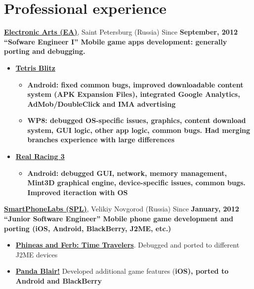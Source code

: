 \section{Professional experience}
{
\fontsize{14pt}{12pt}\selectfont
\href{http://www.ea.com}{\bfseries Electronic Arts (EA)\mdseries},
Saint Petersburg (Russia)
}
\subitem Since \bfseries September, 2012 \mdseries ``Sofware Engineer I''
\subitem Mobile game apps development: generally porting and debugging.
\begin{itemize}
\setlength{\itemindent}{20pt}
\item
    \href{https://play.google.com/store/apps/details?id=com.ea.tetrisblitz_row}
        {\bfseries Tetris Blitz \mdseries}
    \begin{itemize}
        \item \bfseries Android\mdseries:
        fixed common bugs,
        improved downloadable content system (APK Expansion Files),
        integrated Google Analytics, AdMob/DoubleClick and IMA advertising
    \end{itemize}
    \begin{itemize}
        \item \bfseries WP8\mdseries:
        debugged OS-specific issues,
        graphics,
        content download system,
        GUI logic,
        other app logic,
        common bugs.
        Had merging branches experience with large differences
    \end{itemize}
\item
    \href{http://www.facebook.com/realracing}
    {\bfseries Real Racing 3\mdseries}
    \begin{itemize}
        \item\bfseries Android\mdseries:
        debugged GUI,
        network,
        memory management,
        Mint3D graphical engine,
        device-specific issues,
        common bugs.
        Improved iteraction with OS
    \end{itemize}
\end{itemize}

{
\vspace{15pt}
\fontsize{14pt}{12pt}\selectfont
\href{http://spl.co}{\bfseries SmartPhoneLabs (SPL)\mdseries},
Velikiy Novgorod (Russia)
}
\subitem Since \bfseries January, 2012 \mdseries ``Junior Software Engineer''
\subitem Mobile phone game development and porting
(iOS, Android, BlackBerry, J2ME, etc.)
\begin{itemize}
\setlength{\itemindent}{20pt}
\item
    \href{http://java.mob.org/game/phineas\_and\_ferb\_time\_travelers.html}
        {\bfseries Phineas and Ferb: Time Travelers\mdseries}.
        Debugged and ported to different J2ME devices
\item
    \href{https://itunes.apple.com/us/app/panda-blair!/id500995558?mt=8}
        {\bfseries Panda Blair!\mdseries}
        Developed additional game features (\bfseries iOS\mdseries),
        ported to \bfseries Android \mdseries and \bfseries BlackBerry\mdseries
\end{itemize}

